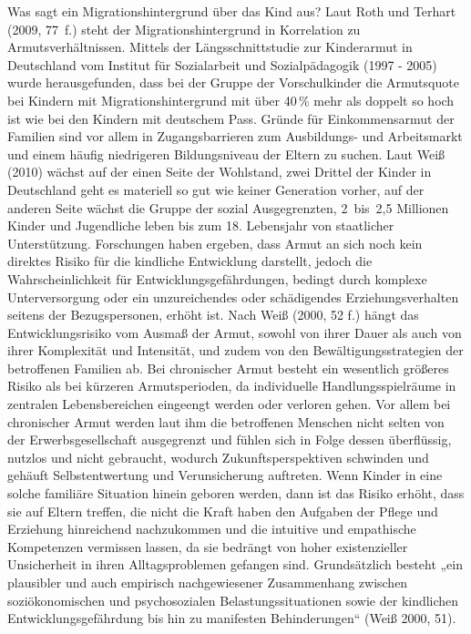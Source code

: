 Was sagt ein Migrationshintergrund über das Kind aus? Laut Roth und Terhart (2009, 77~f.) steht der Migrationshintergrund in Korrelation zu Armutsverhältnissen. 
Mittels der Längsschnittstudie zur Kinderarmut in Deutschland vom Institut für Sozialarbeit und Sozialpädagogik (1997 - 2005) wurde herausgefunden, dass bei der Gruppe der Vorschulkinder die Armutsquote bei Kindern mit Migrationshintergrund mit über 40\,\% mehr als doppelt so hoch ist wie bei den Kindern mit deutschem Pass. Gründe für Einkommensarmut der Familien sind vor allem in Zugangsbarrieren zum Ausbildungs- und Arbeitsmarkt und einem häufig niedrigeren Bildungsniveau der Eltern zu suchen. 
Laut Weiß (2010) wächst auf der einen Seite der Wohlstand, zwei Drittel der Kinder in Deutschland geht es materiell so gut wie keiner Generation vorher, auf der anderen Seite wächst die Gruppe der sozial Ausgegrenzten, 2~bis~2,5 Millionen Kinder und Jugendliche leben bis zum 18. Lebensjahr von staatlicher Unterstützung. 
Forschungen haben ergeben, dass Armut an sich noch kein direktes Risiko für die kindliche Entwicklung darstellt, jedoch die Wahrscheinlichkeit für Entwicklungsgefährdungen, bedingt durch komplexe Unterversorgung oder ein unzureichendes oder schädigendes Erziehungsverhalten seitens der Bezugspersonen, erhöht ist. 
Nach Weiß (2000, 52 f.) hängt das Entwicklungsrisiko vom Ausmaß der Armut, sowohl von ihrer Dauer als auch von ihrer Komplexität und Intensität, und zudem von den Bewältigungsstrategien der betroffenen Familien ab. Bei chronischer Armut besteht ein wesentlich größeres Risiko als bei kürzeren Armutsperioden, da individuelle Handlungsspielräume in zentralen Lebensbereichen eingeengt werden oder verloren gehen.
Vor allem bei chronischer Armut werden laut ihm die betroffenen Menschen nicht selten von der Erwerbsgesellschaft ausgegrenzt und fühlen sich in Folge dessen überflüssig, nutzlos und nicht gebraucht, wodurch Zukunftsperspektiven schwinden und gehäuft Selbstentwertung und Verunsicherung auftreten. Wenn Kinder in eine solche familiäre Situation hinein geboren werden, dann ist das Risiko erhöht, dass sie auf Eltern treffen, die nicht die Kraft haben den Aufgaben der Pflege und Erziehung hinreichend nachzukommen und die intuitive und empathische Kompetenzen vermissen lassen, da sie bedrängt von hoher existenzieller Unsicherheit in ihren Alltagsproblemen gefangen sind.   
Grundsätzlich besteht „ein plausibler und auch empirisch nachgewiesener Zusammenhang zwischen soziökonomischen und psychosozialen Belastungssituationen sowie der kindlichen Entwicklungsgefährdung bis hin zu manifesten Behinderungen“ (Weiß 2000, 51).

